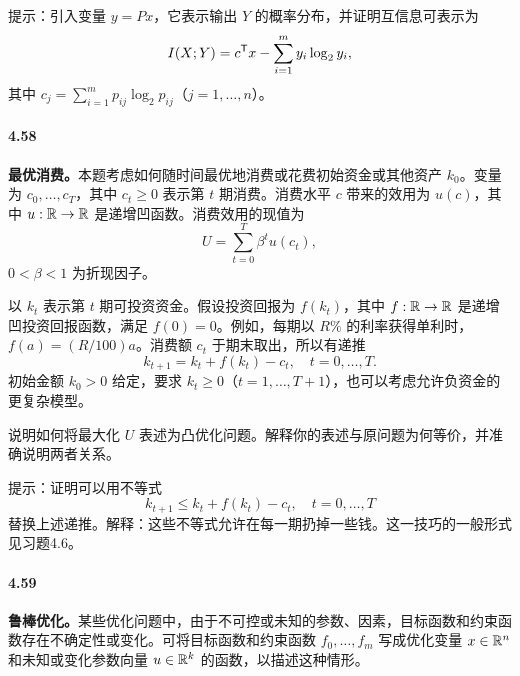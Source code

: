 提示：引入变量 $y=Px$，它表示输出 $Y$ 的概率分布，并证明互信息可表示为
\[
I(X;Y)=c^\mathsf T x-\sum_{i=1}^m y_i\log_2y_i,
\]
其中 $c_j=\sum_{i=1}^m p_{ij}\log_2p_{ij}$（$j=1,\ldots,n$）。

\paragraph{4.58}\textbf{最优消费。}本题考虑如何随时间最优地消费或花费初始资金或其他资产 $k_0$。变量为 $c_0,\ldots,c_T$，其中 $c_t\ge0$ 表示第 $t$ 期消费。消费水平 $c$ 带来的效用为 $u(c)$，其中 $u:\mathbb R\to\mathbb R$ 是递增凹函数。消费效用的现值为
\[
U=\sum_{t=0}^T\beta^t u(c_t),
\]
$0<\beta<1$ 为折现因子。

以 $k_t$ 表示第 $t$ 期可投资资金。假设投资回报为 $f(k_t)$，其中 $f:\mathbb R\to\mathbb R$ 是递增凹投资回报函数，满足 $f(0)=0$。例如，每期以 $R\%$ 的利率获得单利时，$f(a)=(R/100)a$。消费额 $c_t$ 于期末取出，所以有递推
\[
k_{t+1}=k_t+f(k_t)-c_t,\quad t=0,\ldots,T.
\]
初始金额 $k_0>0$ 给定，要求 $k_t\ge0$（$t=1,\ldots,T+1$），也可以考虑允许负资金的更复杂模型。

说明如何将最大化 $U$ 表述为凸优化问题。解释你的表述与原问题为何等价，并准确说明两者关系。

提示：证明可以用不等式
\[
k_{t+1}\le k_t+f(k_t)-c_t,\quad t=0,\ldots,T
\]
替换上述递推。解释：这些不等式允许在每一期扔掉一些钱。这一技巧的一般形式见习题4.6。

\paragraph{4.59}\textbf{鲁棒优化。}某些优化问题中，由于不可控或未知的参数、因素，目标函数和约束函数存在不确定性或变化。可将目标函数和约束函数 $f_0,\ldots,f_m$ 写成优化变量 $x\in\mathbb R^n$ 和未知或变化参数向量 $u\in\mathbb R^k$ 的函数，以描述这种情形。

